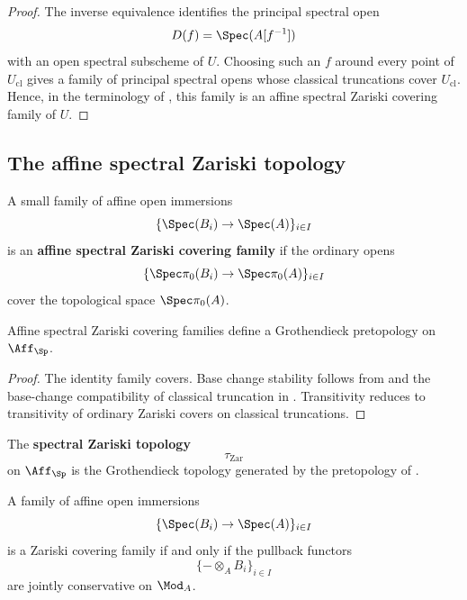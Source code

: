 \begin{proof}
The inverse equivalence identifies the principal spectral open
\[
    D(f)
    =
    \Spec(A[f^{-1}])
\]
with an open spectral subscheme of \(U\). Choosing such an \(f\) around
every point of \(U_{\mathrm{cl}}\) gives a family of principal spectral
opens whose classical truncations cover \(U_{\mathrm{cl}}\). Hence, in
the terminology of
,
this family is an affine spectral Zariski covering family of \(U\).
\end{proof}

\subsection{The affine spectral Zariski topology}

\begin{definition}
\label{def:affine-zariski-cover}
A small family of affine open immersions
\[
    \{\Spec(B_i)\to\Spec(A)\}_{i\in I}
\]
is an \textbf{affine spectral Zariski covering family} if the ordinary
opens
\[
    \{\Spec\pi_0(B_i)\to\Spec\pi_0(A)\}_{i\in I}
\]
cover the topological space $\Spec\pi_0(A)$.
\end{definition}

\begin{proposition}
\label{prop:spectral-zariski-pretopology}
Affine spectral Zariski covering families define a Grothendieck
pretopology on $\Aff_{\Sp}$.
\end{proposition}

\begin{proof}
The identity family covers. Base change stability follows from
 and the base-change compatibility of
classical truncation in
. Transitivity reduces to
transitivity of ordinary Zariski covers on classical truncations.
\end{proof}

\begin{definition}
\label{def:spectral-zariski-topology}
The \textbf{spectral Zariski topology}
\[
    \tau_{\mathrm{Zar}}
\]
on $\Aff_{\Sp}$ is the Grothendieck topology generated by the
pretopology of .
\end{definition}

\begin{proposition}
\label{prop:zariski-cover-joint-conservativity}
A family of affine open immersions
\[
    \{\Spec(B_i)\to\Spec(A)\}_{i\in I}
\]
is a Zariski covering family if and only if the pullback functors
\[
    \{-\otimes_A B_i\}_{i\in I}
\]
are jointly conservative on $\Mod_A$.
\end{proposition}

